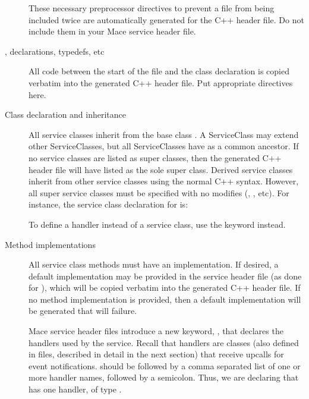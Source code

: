 \begin{description}

\item[] These necessary
  preprocessor directives to prevent a file from being included twice
  are automatically generated for the C++ header file.  Do not include
  them in your  Mace service header file.

\item[, declarations, typedefs, etc] All code
  between the start of the  file and the class
  declaration is copied verbatim into the generated C++ header file.
  Put appropriate  directives here.

\item[Class declaration and inheritance] All service classes inherit
  from the base class .  A ServiceClass may
  extend other ServiceClasses, but all ServiceClasses have
   as a common ancestor.  If no service
  classes are listed as super classes, then the generated C++ header
  file will have  listed as the sole super
  class.  Derived service classes inherit from other service classes
  using the normal C++ syntax.  However, all super service classes
  must be specified with no modifies (,
  , etc).  For instance, the service class declaration for
   is:

\begin{programlisting}
serviceclass OverlayRouterServiceClass : OverlayServiceClass { ... 
\end{programlisting}

  To define a handler instead of a service class, use the keyword
   instead.

\item[Method implementations] All service class methods must have an
  implementation.  If desired, a default implementation may be
  provided in the service header file (as done for
  ), which will be copied verbatim into
  the generated C++ header file.  If no method implementation is
  provided, then a default implementation will be generated that
  will  failure.

\item[] Mace service header files introduce a new
  keyword, , that declares the handlers used by the
  service.  Recall that handlers are classes (also defined in
   files, described in detail in the next section) that
  receive upcalls for event notifications.  
  should be followed by a comma separated list of one or more handler
  names, followed by a semicolon.  Thus, we are declaring that
   has one handler, of type
  .


\end{description}
